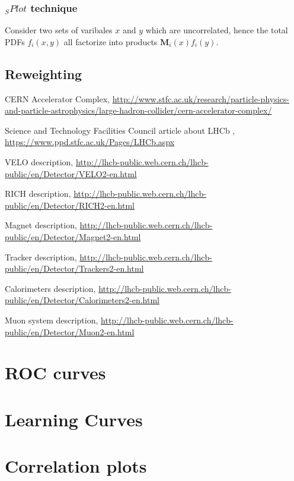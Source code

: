\documentclass[english]{uzhpub}
\begin{document}
\subsubsection{$_{S} Plot$ technique}
Consider two sets of varibales $x$ and $y$ which are uncorrelated, hence the total PDFs $f_i (x,y)$ all factorize into products $\textbf{M}_i (x) f_i(y)$.



\subsection{Reweighting}






\begin{thebibliography}{100}

   CERN Accelerator Complex,
  \url{http://www.stfc.ac.uk/research/particle-physics-and-particle-astrophysics/large-hadron-collider/cern-accelerator-complex/}

   Science and Technology Facilities Council article about LHCb ,
  \url{https://www.ppd.stfc.ac.uk/Pages/LHCb.aspx}

   VELO description,
  \url{http://lhcb-public.web.cern.ch/lhcb-public/en/Detector/VELO2-en.html}

   RICH description,
  \url{http://lhcb-public.web.cern.ch/lhcb-public/en/Detector/RICH2-en.html}

   Magnet description,
  \url{http://lhcb-public.web.cern.ch/lhcb-public/en/Detector/Magnet2-en.html}

   Tracker description,
  \url{http://lhcb-public.web.cern.ch/lhcb-public/en/Detector/Trackers2-en.html}

   Calorimeters description,
  \url{http://lhcb-public.web.cern.ch/lhcb-public/en/Detector/Calorimeters2-en.html}

   Muon system description,
  \url{http://lhcb-public.web.cern.ch/lhcb-public/en/Detector/Muon2-en.html}

\end{thebibliography}

\begin{appendix}
  \section{ROC curves}
  \label{app:roc}
  

  \section{Learning Curves}
  \label{app:lc}

  \section{Correlation plots}
  \label{app:corr}
  


\end{appendix}
\end{document}
